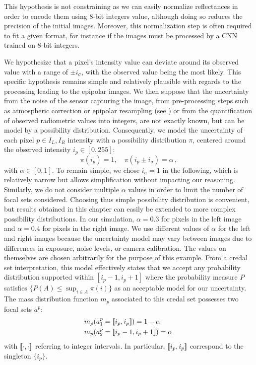 \begin{remark}
    This hypothesis is not constraining as we can easily normalize reflectances in order to encode them using 8-bit integers value, although doing so reduces the precision of the initial images. Moreover, this normalization step is often required to fit a given format, for instance if the images must be processed by a CNN trained on 8-bit integers.
\end{remark}

We hypothesize that a pixel's intensity value can deviate around its observed value with a range of $\pm i_\sigma$, with the observed value being the most likely. This specific hypothesis remains simple and relatively plausible with regards to the processing leading to the epipolar images. We then suppose that the uncertainty from the noise of the sensor capturing the image, from pre-processing steps such as atmospheric correction or epipolar resampling (see ) or from the quantification of observed radiometric values into integers, are not exactly known, but can be model by a possibility distribution. Consequently, we model the uncertainty of each pixel $p\in I_L,I_R$ intensity with a possibility distribution $\pi$, centered around the observed intensity $i_p\in[0,255]$:
\begin{equation}\label{eq:pixel_possibility}
    \pi(i_p)=1,\quad \pi(i_p\pm i_\sigma)=\alpha\,,
\end{equation}
with $\alpha \in [0,1]$. To remain simple, we chose $i_\sigma=1$ in the following, which is relatively narrow but allows simplification without impacting our reasoning. Similarly, we do not consider multiple $\alpha$ values in order to limit the number of focal sets considered. Choosing thus simple possibility distribution is convenient, but results obtained in this chapter can easily be extended to more complex possibility distributions. In our simulation, $\alpha = 0.3$ for pixels in the left image and $\alpha = 0.4$ for pixels in the right image. We use different values of $\alpha$ for the left and right images because the uncertainty model may vary between images due to differences in exposure, noise levels, or camera calibration. The values on themselves are chosen arbitrarily for the purpose of this example. From a credal set interpretation, this model effectively states that we accept any probability distribution supported within $[i_p - 1, i_p + 1]$ where the probability measure $P$ satisfies $\{P(A) \leq \sup_{i \in A} \pi(i)\}$ as an acceptable model for our uncertainty. The mass distribution function $m_p$ associated to this credal set possesses two focal sets $a^p$:
\begin{eqnarray}
    &m_p(a^p_1=[\![ i_p, i_p]\!])=1-\alpha\,\nonumber\\
    &m_p(a^p_2=[\![ i_p-1, i_p + 1]\!])=\alpha\,\label{eq:pixel_mass}
\end{eqnarray}
with $[\![\cdot, \cdot]\!]$ referring to integer intervals. In particular, $[\![ i_p, i_p]\!]$ correspond to the singleton $\{i_p\}$.

